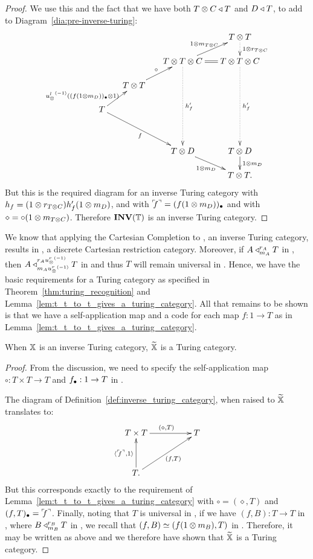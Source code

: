 \begin{proof}
  We use this and the fact that we have both $T\otimes C \triangleleft T$
  and $D \triangleleft T$, to add to   Diagram~\ref{dia:pre-inverse-turing}:
  \[
    \xymatrix @C=15pt @R=15pt{
      & & & T \* T \ar@{.>}[d]^{1\*r_{T\*C}}\\
      & & T \* T \* C \ar@{.>}[dddd]^{h'_f} \ar[ur]^{1\*m_{T\*C}} \ar@{=}[r] &T\*T\*C \ar@{.>}[dddd]^{h'_f} \\
      &T\*T \ar[ur]^{\circ} & & \\
      T \ar[ur]^(.3){\inv{\usl}(\code{(f(1\*m_D))}\*1)} \ar[ddrr]_{f} \\
      & & & \\
      && T\*D \ar[dr]_{1\*m_D} &  T\*D \ar[d]^{1\*m_D}\\
      &&&T\*T.
    }
  \]
  But this is the required diagram for an inverse Turing category with $h_f = (1\otimes r_{T\otimes C}) h'_f (1\otimes m_D)$,
  and with ${}^\ulcorner\!\!f^\urcorner = (f(1\otimes m_D))_{\bullet}$ and  with $\diamond = \circ(1\otimes m_{T\otimes C})$. Therefore
  $\mathbf{INV}({\mathbb{T}})$ is an inverse Turing category.
\end{proof}

We know that applying the Cartesian Completion to \X, an inverse Turing category, results in \Xt, a
discrete Cartesian restriction category. Moreover, if $A\triangleleft_{m_A}^{r_A} T$ in \X, then $A
\triangleleft_{m_A{u_{\otimes}^r}^{(-1)}}^{r_A{u_{\otimes}^r}^{(-1)}} T$ in \Xt and thus $T$ will remain universal in
\Xt. Hence, we have the basic requirements for a Turing category as specified in
Theorem~\ref{thm:turing_recognition} and Lemma~\ref{lem:t_t_to_t_gives_a_turing_category}. All that
remains to be shown is that we have a self-application map and a code for each map $f:1\to T$ as in
Lemma~\ref{lem:t_t_to_t_gives_a_turing_category}.

\begin{theorem}\label{thm:inverse_turing_category_gives_a_turing_category}
  When $\mathbb{X}$ is an inverse Turing category, $\widetilde{\mathbb{X}}$ is a Turing category.
\end{theorem}
\begin{proof}
  From the discussion, we need to specify the self-application map $\circ:T\times T \to T$ and
  $f_{\bullet}:1 \to T$ in \Xt.

  The diagram of Definition~\ref{def:inverse_turing_category}, when raised to $\widetilde{\mathbb{X}}$
  translates to:
  \[
    \xymatrix@C+25pt@R+10pt{
      T \times T \ar[r]^{(\diamond, T)} &T \\
      T. \ar[u]^{\<\iname{f},1\>} \ar[ur]_{(f, T)}
    }
  \]
  But this corresponds exactly to the requirement of
  Lemma~\ref{lem:t_t_to_t_gives_a_turing_category} with $\circ = (\diamond,T)$ and $(f,T)_{\bullet} =
  {}^\ulcorner\!\!f^\urcorner$.  Finally, noting that $T$ is universal in \X, if we have $(f,B):T\to T$ in \Xt,
  where $B\triangleleft_{m_B}^{r_B} T$ in \X, we recall that $(f,B) \overset{\scriptscriptstyle }{\simeq} (f(1\otimes m_B),T)$ in
  \X. Therefore, it may be  written as above and we therefore have shown that $\widetilde{\mathbb{X}}$ is a Turing
  category.
\end{proof}

